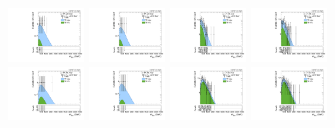 \begin{figure}[htbp]
  \includegraphics[width=0.18\textwidth]{fig/fitValidation/PostFit_SR_MVV_MJJ150to210__mu_HP_vbf_LDy_Run2.pdf}
  \includegraphics[width=0.18\textwidth]{fig/fitValidation/PostFit_SR_MVV_MJJ150to210__e_HP_vbf_LDy_Run2.pdf}
  \includegraphics[width=0.18\textwidth]{fig/fitValidation/PostFit_SR_MVV_MJJ150to210__mu_LP_vbf_LDy_Run2.pdf}
  \includegraphics[width=0.18\textwidth]{fig/fitValidation/PostFit_SR_MVV_MJJ150to210__e_LP_vbf_LDy_Run2.pdf}\\
  \includegraphics[width=0.18\textwidth]{fig/fitValidation/PostFit_SR_MVV_MJJ150to210__mu_HP_bb_HDy_Run2.pdf}
  \includegraphics[width=0.18\textwidth]{fig/fitValidation/PostFit_SR_MVV_MJJ150to210__e_HP_bb_HDy_Run2.pdf}
  \includegraphics[width=0.18\textwidth]{fig/fitValidation/PostFit_SR_MVV_MJJ150to210__mu_LP_bb_HDy_Run2.pdf}
  \includegraphics[width=0.18\textwidth]{fig/fitValidation/PostFit_SR_MVV_MJJ150to210__e_LP_bb_HDy_Run2.pdf}\\

\end{figure}
